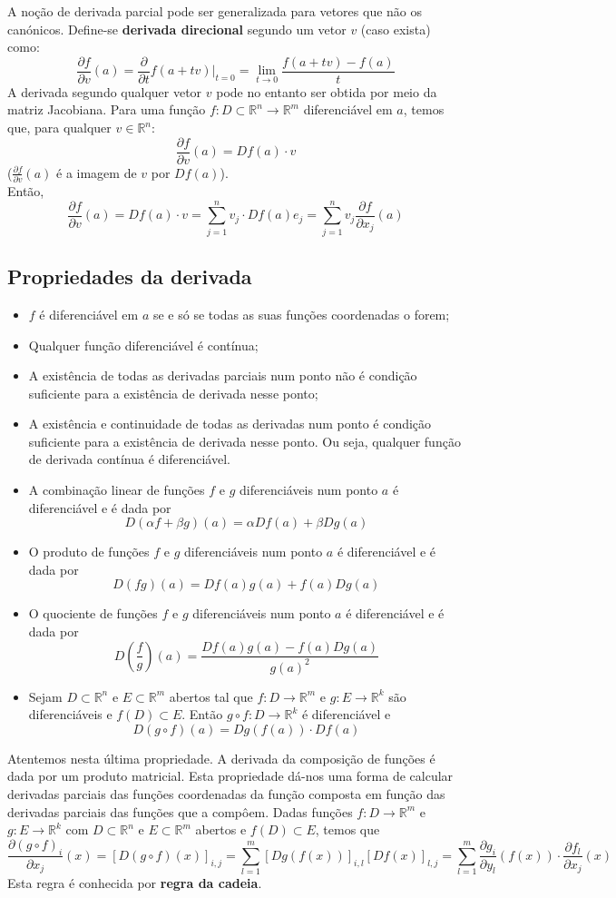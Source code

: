 \documentclass{article}
\newcommand{\R}{\mathbb{R}}
\begin{document}
A noção de derivada parcial pode ser generalizada para vetores que não os canónicos. Define-se \textbf{derivada direcional} segundo um vetor $v$ (caso exista) como:
$$
\frac{\partial f}{\partial v}(a) = \frac{\partial}{\partial t} f(a+tv) \Big|_{t=0} = \lim_{t \to 0} \frac{f(a+tv)-f(a)}{t}
$$
A derivada segundo qualquer vetor $v$ pode no entanto ser obtida por meio da matriz Jacobiana. Para uma função $f: D \subset \R^n \to \R^m$ diferenciável em $a$, temos que, para qualquer $v \in \R^n$:
$$
\frac{\partial f}{\partial v}(a) = Df(a) \cdot v
$$
($\frac{\partial f}{\partial v}(a)$ é a imagem de $v$ por $Df(a)$).\\
Então,
$$
\frac{\partial f}{\partial v}(a) = Df(a)\cdot v = \sum_{j=1}^n v_j \cdot Df(a)e_j = \sum_{j=1}^n v_j \frac{\partial f}{\partial x_j} (a)
$$
\subsection{Propriedades da derivada}
\begin{itemize}
	\item $f$ é diferenciável em $a$ se e só se todas as suas funções coordenadas o forem;
	\item Qualquer função diferenciável é contínua;
	\item A existência de todas as derivadas parciais num ponto não é condição suficiente para a existência de derivada nesse ponto; 
	\item A existência e continuidade de todas as derivadas num ponto é condição suficiente para a existência de derivada nesse ponto. Ou seja, qualquer função de derivada contínua é diferenciável.
	\item A combinação linear de funções $f$ e $g$ diferenciáveis num ponto $a$ é diferenciável e é dada por $$ D(\alpha f+\beta g)(a)=\alpha Df(a)+\beta Dg(a)$$
	\item O produto de funções $f$ e $g$ diferenciáveis num ponto $a$ é diferenciável e é dada por $$ D(fg)(a)=Df(a)g(a)+f(a)Dg(a)$$
	\item O quociente de funções $f$ e $g$ diferenciáveis num ponto $a$ é diferenciável e é dada por $$ D\left(\frac{f}{g} \right)(a)=\frac{Df(a)g(a)-f(a)Dg(a)}{g(a)^2} $$
	\item Sejam $D \subset \R^n$ e $E \subset \R^m$ abertos tal que $f: D \to \R^m$ e $g: E \to \R^k$ são diferenciáveis e $f(D) \subset E$. Então $g \circ f: D \to \R^k$ é diferenciável e $$ D(g \circ f)(a) = Dg(f(a)) \cdot Df(a) $$
\end{itemize}
Atentemos nesta última propriedade. A derivada da composição de funções é dada por um produto matricial. Esta propriedade dá-nos uma forma de calcular derivadas parciais das funções coordenadas da função composta em função das derivadas parciais das funções que a compôem. Dadas funções $f: D \to \R^m$ e $g: E \to \R^k$ com $D \subset \R^n$ e $E \subset \R^m$ abertos e $f(D) \subset E$, temos que
$$
\frac{\partial (g \circ f)_i }{\partial x_j}(x) = \left[ D(g \circ f)(x) \right]_{i,j} = \sum_{l=1}^m \left[ Dg(f(x)) \right]_{i,l} \left[ Df(x) \right]_{l,j} = \sum_{l=1}^m \frac{\partial g_i}{\partial y_l}(f(x)) \cdot \frac{\partial f_l}{\partial x_j}(x)
$$
Esta regra é conhecida por \textbf{regra da cadeia}.\\
\end{document}
